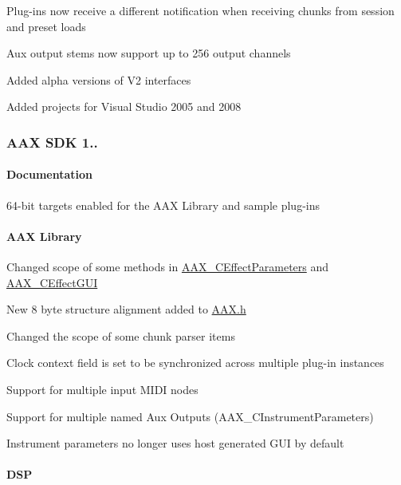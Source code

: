 \begin{DoxyItemize}
\item Plug-\/ins now receive a different notification when receiving chunks from session and preset loads 
\item Aux output stems now support up to 256 output channels 
\item Added alpha versions of V2 interfaces 
\item Added projects for Visual Studio 2005 and 2008 
\end{DoxyItemize}\hypertarget{a00847_aax_sdk_1p0p6}{}\subsubsection{A\+A\+X S\+D\+K 1..}\label{a00847_aax_sdk_1p0p6}
\hypertarget{a00847_aax_sdk_1p0p6_Documentation}{}\paragraph{Documentation}\label{a00847_aax_sdk_1p0p6_Documentation}

\begin{DoxyItemize}
\item 64-\/bit targets enabled for the A\+AX Library and sample plug-\/ins 
\end{DoxyItemize}\hypertarget{a00847_aax_sdk_1p0p6_AAXLibrary}{}\paragraph{A\+A\+X Library}\label{a00847_aax_sdk_1p0p6_AAXLibrary}

\begin{DoxyItemize}
\item Changed scope of some methods in \mbox{\hyperlink{a01481}{A\+A\+X\+\_\+\+C\+Effect\+Parameters}} and \mbox{\hyperlink{a01477}{A\+A\+X\+\_\+\+C\+Effect\+G\+UI}} 
\item New 8 byte structure alignment added to \mbox{\hyperlink{a00392}{A\+A\+X.\+h}} 
\item Changed the scope of some chunk parser items 
\item Clock context field is set to be synchronized across multiple plug-\/in instances 
\item Support for multiple input M\+I\+DI nodes 
\item Support for multiple named Aux Outputs (A\+A\+X\+\_\+\+C\+Instrument\+Parameters) 
\item Instrument parameters no longer uses host generated G\+UI by default 
\end{DoxyItemize}\hypertarget{a00847_aax_sdk_1p0p6_DSP}{}\paragraph{D\+SP}\label{a00847_aax_sdk_1p0p6_DSP}

